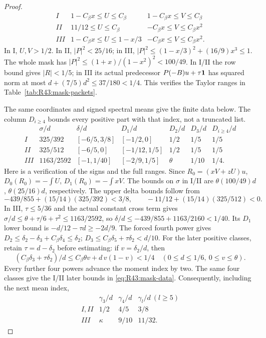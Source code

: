 \begin{proof}
\begin{equation}
\begin{array}{c|c|c}
I&1-C_\beta x\le U\le C_\beta
  &1-C_\beta x\le V\le C_\beta\\
II&11/12\le U\le C_\beta
  &-C_\beta x\le V\le C_\beta x^2\\
III&1-C_\beta x\le U\le1-x/3
  &-C_\beta x\le V\le C_\beta x^2.
\end{array}
\end{equation}
In I, \(U,V>1/2\). In II, \(|P|^2<25/16\); in III,
\(|P|^2\le(1-x/3)^2+(16/9)x^3\le1\).
The whole mask has \(|P|^2\le(1+x)/(1-x^2)^2<100/49\).
In I/II the row bound gives \(|R|<1/5\); in III its actual
predecessor \(P(-B)u+\tau\mathbf1\) has squared norm at most
\(d+(7/5)d^2\le37/180<1/4\). This verifies the Taylor ranges
in Table~\ref{tab:R43:mask-packets}.

The same coordinates and signed spectral means give the finite data
below. The column \(D_{i\ge4}\) bounds every positive part with
that index, not a truncated list.
\begin{equation}\label{eq:R43:mask-data}
\begin{array}{c|c|c|c|c|c|c}
 &\sigma/d&\delta/d&D_1/d&D_2/d&D_3/d&D_{i\ge4}/d\\\hline
I&325/392&[-6/5,3/8]&[-1/2,0]&1/2&1/5&1/5\\
II&325/512&[-6/5,0]&[-1/12,1/5]&1/2&1/5&1/5\\
III&1163/2592&[-1,1/40]&[-2/9,1/5]&\theta&1/10&1/4.
\end{array}
\end{equation}
Here is a verification of the signs and the full ranges.
Since \(R_0=(xV+zU)u\),
\(D_0(R_0)=-\int U\), \(D_1(R_0)=-\int xV\).
The bounds on \(\sigma\) in I/II are
\(\theta(100/49)d\), \(\theta(25/16)d\), respectively.
The upper delta bounds follow from
\[
 -439/855+(15/14)(325/392)<3/8,\qquad
 -11/12+(15/14)(325/512)<0.
\]
In III, \(\tau\le5/36\) and the actual constant cross term gives
\(\sigma/d\le\theta+\tau/6+\tau^2\le1163/2592\), so
\(\delta/d\le-439/855+1163/2160<1/40\).
Its \(D_1\) lower bound is \(-d/12-\tau d\ge-2d/9\).
The forced fourth power gives
\(D_2\le\delta_2-\delta_3+C_\beta\delta_4\le\delta_2\);
\(D_3\le C_\beta\delta_5+\tau\delta_2<d/10\).
For the later positive classes, retain \(\tau=d-\delta_2\)
before estimating: if \(v=\delta_2/d\), then
\[
 (C_\beta\delta_3+\tau\delta_2)/d
 \le C_\beta\theta v+d\,v(1-v)<1/4
 \quad(0\le d\le1/6,\ 0\le v\le\theta).
\]
Every further four powers advance the moment index by two.
The same four classes give the I/II later bounds in
\eqref{eq:R43:mask-data}. Consequently, including the next mean index,
\begin{equation}\label{eq:R43:mask-losses}
\begin{array}{c|ccc}
 &\gamma_3/d&\gamma_4/d&\gamma_l/d\ (l\ge5)\\\hline
I,II&1/2&4/5&3/8\\
III&\kappa&9/10&11/32.
\end{array}
\end{equation}


\end{proof}
